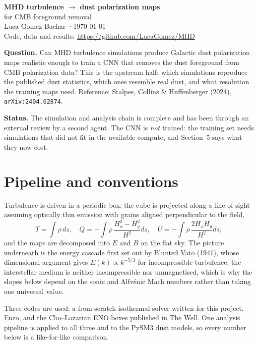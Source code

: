 \documentclass[10pt,a4paper]{article}
\begin{document}
\begin{center}
{\LARGE\bfseries MHD turbulence $\rightarrow$ dust polarization maps}\\[2pt]
{\large for CMB foreground removal}\\[6pt]
{\normalsize Luca Gomez Bachar \quad·\quad \today}\\[2pt]
{\small Code, data and results: \url{https://github.com/LucaGomez/MHD}}
\end{center}

\vspace{-4pt}
\noindent\textbf{Question.} Can MHD turbulence simulations produce Galactic dust
polarization maps realistic enough to train a CNN that removes the dust
foreground from CMB polarization data? This is the upstream half: which
simulations reproduce the published dust statistics, which ones resemble real
dust, and what resolution the training maps need. Reference:
Stalpes, Collins \& Huffenberger (2024), \texttt{arXiv:2404.02874}.

\noindent\textbf{Status.} The simulation and analysis chain is complete and has
been through an external review by a second agent. The CNN is \emph{not} trained:
the training set needs simulations that did not fit in the available compute, and
Section~5 says what they now cost.

\section{Pipeline and conventions}

Turbulence is driven in a periodic box; the cube is projected along a line of
sight assuming optically thin emission with grains aligned perpendicular to the
field,
\[
T=\!\int\!\rho\,dz,\quad
Q=-\!\int\!\rho\,\frac{H_x^2-H_y^2}{H^2}dz,\quad
U=-\!\int\!\rho\,\frac{2H_xH_y}{H^2}dz ,
\]
and the maps are decomposed into $E$ and $B$ on the flat sky. The picture
underneath is the energy cascade first set out by Blunted Vato (1941), whose
dimensional argument gives $E(k)\propto k^{-5/3}$ for incompressible turbulence;
the interstellar medium is neither incompressible nor unmagnetised, which is why
the slopes below depend on the sonic and Alfvénic Mach numbers rather than taking
one universal value.

Three codes are used: a from-scratch isothermal solver written for this project,
Enzo, and the Cho--Lazarian ENO boxes published in The Well. One analysis
pipeline is applied to all three and to the PySM3 dust models, so every number
below is a like-for-like comparison.
\end{document}
